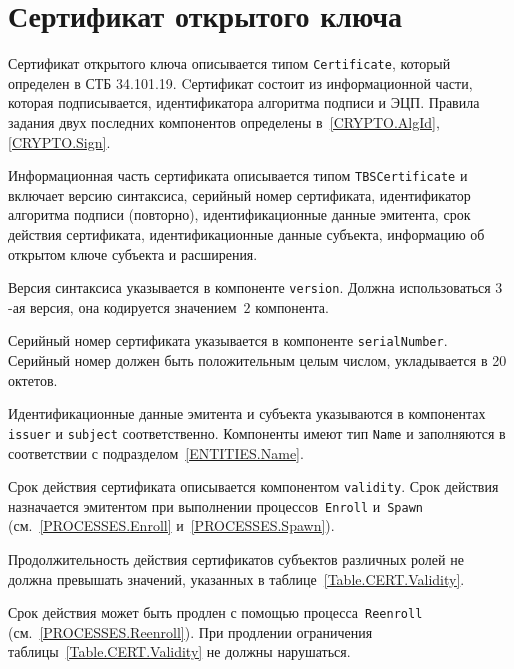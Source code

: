 \section{Сертификат открытого ключа}\label{FMT.Cert}

Сертификат открытого ключа описывается типом 
\texttt{Certificate}, который определен в СТБ 34.101.19.
%
Cертификат состоит из информационной части, которая 
подписывается, идентификатора алгоритма подписи и ЭЦП. 
Правила задания двух последних компонентов определены 
в~\ref{CRYPTO.AlgId}, \ref{CRYPTO.Sign}.

Информационная часть сертификата описывается типом 
\texttt{TBSCertificate} и включает версию синтаксиса, 
серийный номер сертификата, идентификатор алгоритма подписи (повторно), 
идентификационные данные эмитента, срок действия сертификата, 
идентификационные данные субъекта, информацию об открытом ключе 
субъекта и расширения. 

Версия синтаксиса указывается в компоненте \texttt{version}.
Должна использоваться $3$-ая версия, она кодируется значением~$2$
компонента.

Серийный номер сертификата указывается в компоненте \texttt{serialNumber}.
Серийный номер должен быть положительным целым числом, 
 укладывается в 20 октетов.

Идентификационные данные эмитента и субъекта указываются в компонентах 
\texttt{issuer} и \texttt{subject} соответственно. Компоненты 
имеют тип \texttt{Name} и заполняются в соответствии с 
подразделом~\ref{ENTITIES.Name}. 

Срок действия сертификата описывается компонентом 
\texttt{validity}. Срок действия назначается эмитентом
при выполнении процессов~\texttt{Enroll} и~\texttt{Spawn}
(см.~\ref{PROCESSES.Enroll} и~\ref{PROCESSES.Spawn}). 


Продолжительность действия сертификатов субъектов различных ролей
не должна превышать значений, указанных в таблице~\ref{Table.CERT.Validity}. 
%

Срок действия может быть продлен с помощью процесса~\texttt{Reenroll}
(см.~\ref{PROCESSES.Reenroll}). При продлении ограничения
таблицы~\ref{Table.CERT.Validity} не должны нарушаться.

